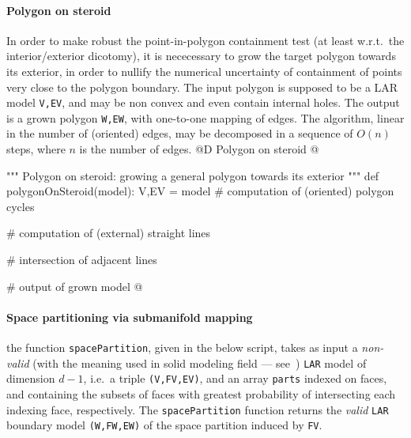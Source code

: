 \documentclass[11pt,oneside]{article}    %
\begin{document}
\paragraph{Polygon on steroid}
In order to make robust the point-in-polygon containment test (at least w.r.t.~the interior/exterior dicotomy), it is nececessary to grow the target polygon towards its exterior, in order to nullify the numerical uncertainty of containment of points very close to the polygon boundary.
The input polygon is supposed to be a LAR model \texttt{V,EV}, and may be non convex and even contain internal holes. The output is a grown polygon \texttt{W,EW}, with one-to-one mapping of edges. The algorithm, linear in the number of (oriented) edges, may be decomposed in a sequence of $O(n)$ steps, where $n$ is the number of edges.
@D Polygon on steroid
@{""" Polygon on steroid: growing a general polygon towards its exterior """
def polygonOnSteroid(model):
    V,EV = model
    # computation of (oriented) polygon cycles
    
    # computation of (external) straight lines
    
    # intersection of adjacent lines
    
    # output of grown model
@}

\paragraph{Space partitioning via submanifold mapping}

the function \texttt{spacePartition}, given in the below script, takes as input a \emph{non-valid} (with the meaning used in solid modeling field --- see~\cite{Requicha:1980:RRS:356827.356833}) \texttt{LAR} model of dimension $d-1$, i.e.~a triple \texttt{(V,FV,EV)}, and an array \texttt{parts} indexed on faces, and containing the subsets of faces with greatest probability of intersecting each indexing face, respectively. The \texttt{spacePartition} function returns the \emph{valid} \texttt{LAR} boundary model \texttt{(W,FW,EW)} of the space partition induced by \texttt{FV}.
 
\end{document}
